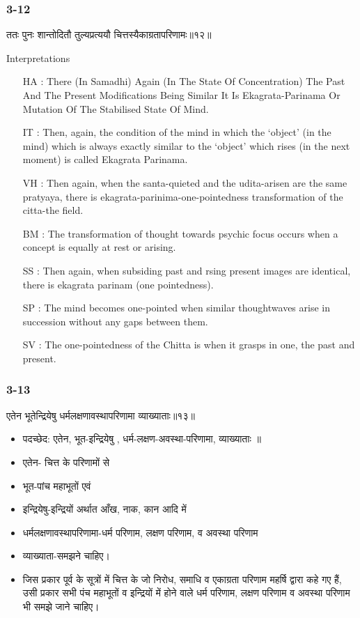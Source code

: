 \begin{frame}[fragile]\frametitle{3-12}
\begin{sanskrit}
ततः पुनः शान्तोदितौ तुल्यप्रत्ययौ चित्तस्यैकाग्रतापरिणामः॥१२॥
\end{sanskrit}

Interpretations
\begin{itemize}	
\item [HA]: There (In Samadhi) Again (In The State Of Concentration) The Past And The Present Modifications Being Similar It Is Ekagrata-Parinama Or Mutation Of The Stabilised State Of Mind.
\item [IT]: Then, again, the condition of the mind in which the ‘object’ (in the mind) which is always exactly similar to the ‘object’ which rises (in the next moment) is called Ekagrata Parinama.
\item [VH]: Then again, when the santa-quieted and the udita-arisen are the same pratyaya, there is ekagrata-parinima-one-pointedness transformation of the citta-the field.
\item [BM]: The transformation of thought towards psychic focus occurs when a concept is equally at rest or arising.
\item [SS]: Then again, when subsiding past and rsing present images are identical, there is ekagrata parinam (one pointedness).
\item [SP]: The mind becomes one-pointed when similar thoughtwaves arise in succession without any gaps between them.
\item [SV]: The one-pointedness of the Chitta is when it grasps in one, the past and present.
\end{itemize}
\end{frame}

\begin{frame}[fragile]\frametitle{3-13}
\begin{sanskrit}
एतेन भूतेन्द्रियेषु धर्मलक्षणावस्थापरिणामा व्याख्याताः॥१३॥
\end{sanskrit}

	\begin{itemize}
	\item पदच्छेद: एतेन, भूत-इन्द्रियेषु , धर्म-लक्षण-अवस्था-परिणामा, व्याख्याताः ॥
	\item एतेन- चित्त के परिणामों से
	\item भूत-पांच महाभूतों एवं
	\item इन्द्रियेषु-इन्द्रियों अर्थात आँख, नाक, कान आदि में
	\item धर्मलक्षणावस्थापरिणामा-धर्म परिणाम, लक्षण परिणाम, व अवस्था परिणाम
	\item व्याख्याता-समझने चाहिए।	
	\item जिस प्रकार पूर्व के सूत्रों में चित्त के जो निरोध, समाधि व एकाग्रता परिणाम महर्षि द्वारा कहे गए हैं, उसी प्रकार सभी पंच महाभूतों व इन्द्रियों में होने वाले धर्म परिणाम, लक्षण परिणाम व अवस्था परिणाम भी समझे जाने चाहिए।
	\end{itemize}
\end{frame}

